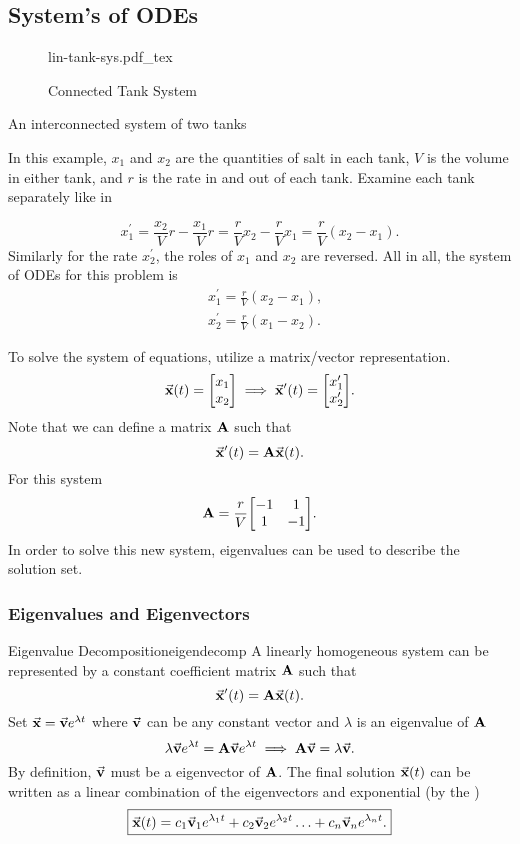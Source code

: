 \documentclass[../notes.tex]{subfiles}
\begin{document}
\subsection{System's of ODEs}

\begin{figure}[htpb]
	\centering
	{lin-tank-sys.pdf_tex}
	\caption{Connected Tank System}
	\label{fig:tanksys}
\end{figure}
\begin{example}{An interconnected system of two tanks}

In this example, $x_1$ and $x_2$ are the quantities of salt in each tank, $V$ is the volume in either tank, and  $r$ is the rate in and out of each tank. Examine each tank separately like in 

$$
x_1^{\prime}=\frac{x_2}{V} r-\frac{x_1}{V} r=\frac{r}{V} x_2-\frac{r}{V} x_1=\frac{r}{V}\left(x_2-x_1\right) .
$$
Similarly for the rate $x_2^{\prime}$, the roles of $x_1$ and $x_2$ are reversed. All in all, the system of ODEs for this problem is
\begin{align*}
&x_1^{\prime}=\frac{r}{V}\left(x_2-x_1\right), \\
&x_2^{\prime}=\frac{r}{V}\left(x_1-x_2\right) .
\end{align*}

To solve the system of equations, utilize a matrix/vector representation.
\begin{align*}
	\va{x}(t) = \mqty[
	x_1 \\
	x_2
	] \implies
	\va{x}'(t) = \mqty[
	x_1' \\
	x_2'
	]
.\end{align*}
Note that we can define a matrix $\vb{A}$ such that
\[
	\va{x}'(t) = \vb{A}\va{x}(t)
.\]
For this system
\[
	\vb{A} = \frac{r}{V}\mqty[
	-1 & 1 \\
	1 & -1 \\
	]
.\]
In order to solve this new system, eigenvalues can be used to describe the solution set.
\end{example}

\subsubsection{Eigenvalues and Eigenvectors}

\begin{theorem}{Eigenvalue Decomposition}{eigendecomp}
	A linearly homogeneous system can be represented by a constant coefficient matrix $\vb{A}$ such that
	\[
		\va{x}'(t)=\vb{A}\va{x}(t)
	.\]
	Set $\va{x}=\va{v}e^{\lambda t}$ where $\va{v}$ can be any constant vector and  $\lambda$ is an eigenvalue of $\vb{A}$
	 \[
		 \lambda \va{v} e^{\lambda t} = \vb{A} \va{v} e^{\lambda t} \implies \vb{A} \va{v} = \lambda \va{v}
	.\]
	By definition, $\va{v}$ must be a eigenvector of  $\vb{A}$. The final solution  $\va{x}(t)$ can be written as a linear combination of the eigenvectors and exponential (by the )
	 \[
		 \boxed{\va{x}(t) = c_1 \va{v}_1 e^{\lambda_1 t} + c_2 \va{v}_2 e^{\lambda_2 t} \hdots + c_n \va{v}_n e^{\lambda_n t}
	 .}\]
\end{theorem}
\end{document}
